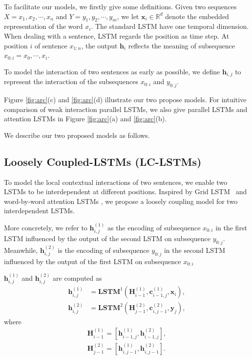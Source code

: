 \documentclass{article}
\def\h{\mathbf{h}}
\def\bx{\mathbf{x}}
\def\cc{\mathbf{c}}
\def\cc{\mathbf{c}}
\def\R{\mathbb{R}}
\begin{document}
To facilitate our models, we firstly give some definitions. Given two sequences $X = x_1,x_2,\cdots,x_n$ and $Y = y_1,y_2,\cdots,y_m$, we let $\bx_i \in \R^d$ denote the embedded representation of the word $x_i$. The standard LSTM have one temporal dimension. When dealing with a sentence, LSTM regards the position as time step. At position $i$ of sentence $x_{1:n}$, the output $\h_i$ reflects the meaning of subsequence $x_{0:i}={x_0,\cdots,x_i}$.

To model the interaction of two sentences as early as possible, we define $\h_{i,j}$ to represent the interaction of the subsequences $x_{0:i}$ and $y_{0:j}$.

Figure \ref{fig:arc}(c) and \ref{fig:arc}(d) illustrate our two propose models. For intuitive comparison of weak interaction parallel LSTMs, we also give  parallel LSTMs and attention LSTMs in Figure \ref{fig:arc}(a) and \ref{fig:arc}(b).

We describe our two proposed models as follows.


\subsection{Loosely Coupled-LSTMs (LC-LSTMs)}
To model the local contextual interactions of two sentences, we enable two LSTMs to be interdependent at different positions. Inspired by Grid LSTM~\cite{kalchbrenner2015grid} and word-by-word attention LSTMs \cite{rocktaschel2015reasoning}, we propose a loosely coupling model for two interdependent LSTMs.

More concretely, we refer to $\h_{i,j}^{(1)}$ as the encoding of subsequence $x_{0:i}$ in the first LSTM influenced by the output of the second LSTM on subsequence $y_{0:j}$. Meanwhile, $\h_{i,j}^{(2)}$ is the encoding of subsequence $y_{0:j}$ in the second LSTM influenced by the output of the first LSTM on subsequence $x_{0:i}$

$\h_{i,j}^{(1)}$ and $\h_{i,j}^{(2)}$ are computed as
\begin{align}
\h_{i,j}^{(1)} &= \mathbf{LSTM}^{1}(\mathbf{H}_{i-1}^{(1)},\cc_{i-1,j}^{(1)},\mathbf{\bx}_{i}), \\
\h_{i,j}^{(2)} &= \mathbf{LSTM}^{2}(\mathbf{H}_{j-1}^{(2)},\cc_{i,j-1}^{(2)},\mathbf{y}_{j}),
\end{align}
where
\begin{align}
\mathbf{H}_{i-1}^{(1)} = [\h_{i-1,j}^{(1)},\h_{i-1,j}^{(2)}], \\
\mathbf{H}_{j-1}^{(2)} = [\h_{i,j-1}^{(1)},\h_{i,j-1}^{(2)}].
\end{align}
\end{document}
